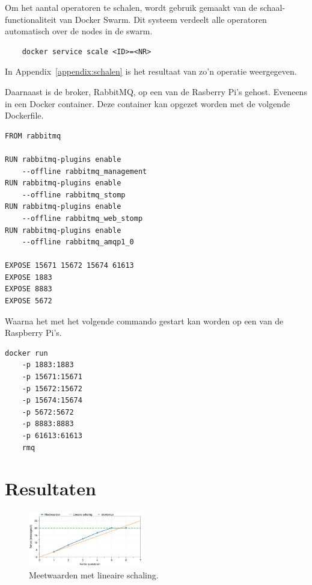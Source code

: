 \documentclass[twocolumn, a4paper]{article}
\begin{document}
Om het aantal operatoren te schalen, wordt gebruik gemaakt van de schaal-functionaliteit van Docker Swarm. Dit systeem verdeelt alle operatoren automatisch over de nodes in de swarm.

\begin{verbatim}
    docker service scale <ID>=<NR>
\end{verbatim}

In Appendix~\ref{appendix:schalen} is het resultaat van zo'n operatie weergegeven. 

Daarnaast is de broker, RabbitMQ, op een van de Rasberry Pi's gehost. Eveneens in een Docker container. Deze container kan opgezet worden met de volgende Dockerfile.

\begin{verbatim}
FROM rabbitmq

RUN rabbitmq-plugins enable 
    --offline rabbitmq_management
RUN rabbitmq-plugins enable 
    --offline rabbitmq_stomp
RUN rabbitmq-plugins enable
    --offline rabbitmq_web_stomp
RUN rabbitmq-plugins enable 
    --offline rabbitmq_amqp1_0

EXPOSE 15671 15672 15674 61613
EXPOSE 1883
EXPOSE 8883
EXPOSE 5672
\end{verbatim}

Waarna het met het volgende commando gestart kan worden op een van de Raspberry Pi's. 
\begin{verbatim}
docker run  
    -p 1883:1883 
    -p 15671:15671 
    -p 15672:15672 
    -p 15674:15674 
    -p 5672:5672 
    -p 8883:8883 
    -p 61613:61613 
    rmq
\end{verbatim}

\section{Resultaten}
\begin{figure}[bt]
    \centering
    \includegraphics[width=0.45\textwidth]{metingen}
    \caption{Meetwaarden met lineaire schaling.}\label{fig:metingen}
\end{figure}
\end{document}
